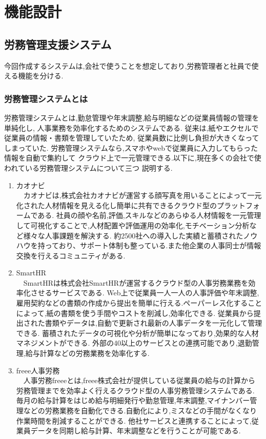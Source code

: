 \chapter{機能設計}
\label{chp:chart}

\section{労務管理支援システム}
\label{sec:chart_figure}
今回作成するシステムは,会社で使うことを想定しており,労務管理者と社員で使える機能を分ける.

\subsection{労務管理システムとは}
労務管理システムとは,勤怠管理や年末調整,給与明細などの従業員情報の管理を単純化し,
人事業務を効率化するためのシステムである.
従来は,紙やエクセルで従業員の情報・書類を管理していたため,
従業員数に比例し負担が大きくなってしまっていた.
労務管理システムなら,スマホやwebで従業員に入力してもらった情報を自動で集約して
クラウド上で一元管理できる.以下に,現在多くの会社で使われている労務管理システムについて三つ
説明する.

\renewcommand{\labelenumi}{(\arabic{enumi})}

\begin{enumerate}
  \item カオナビ \\
  　カオナビは,株式会社カオナビが運営する顔写真を用いることによって一元化された人材情報を見える化し簡単に共有できるクラウド型のプラットフォームである.
  社員の顔や名前,評価,スキルなどのあらゆる人材情報を一元管理して可視化することで,人材配置や評価運用の効率化,モチベーション分析など様々な人事課題を解決する.
  約2500社への導入した実績と蓄積されたノウハウを持っており、サポート体制も整っている.また他企業の人事同士が情報交換を行えるコミュニティがある.\\

  \item SmartHR\\
  　SmartHRは株式会社SmartHRが運営するクラウド型の人事労務業務を効率化させるサービスである.
  Web上で従業員一人一人の人事評価や年末調整,雇用契約などの書類の作成から提出を簡単に行える.ペーパーレス化することによって,紙の書類を使う手間やコストを削減し,効率化できる.
  従業員から提出された書類やデータは,自動で更新され最新の人事データを一元化して管理できる.
  蓄積されたデータの可視化や分析が簡単になっており,効果的な人材マネジメントができる.
  外部の40以上のサービスとの連携可能であり,退勤管理,給与計算などの労務業務を効率化する. \\

  \item freee人事労務\\
  　人事労務freeeとは,freee株式会社が提供している従業員の給与の計算から労務管理までを効率よく行えるクラウド型の人事労務管理システムである.
毎月の給与計算をはじめ給与明細発行や勤怠管理,年末調整,マイナンバー管理などの労務業務を自動化できる.自動化により,ミスなどの手間がなくなり作業時間を削減することができる.
他社サービスと連携することによって,従業員データを同期し給与計算、年末調整などを行うことが可能である.
\end{enumerate}

